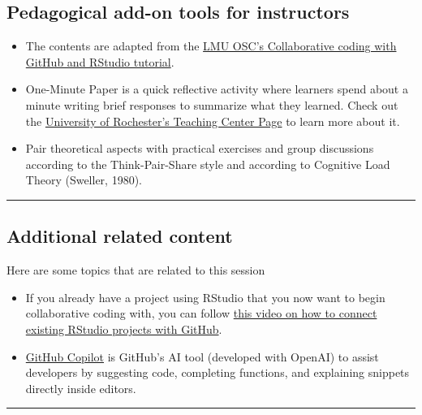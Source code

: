 \documentclass[
  letterpaper,
  DIV=11,
  numbers=noendperiod]{scrartcl}
\providecommand{\tightlist}{%
  \setlength{\itemsep}{0pt}\setlength{\parskip}{0pt}}
\begin{document}
\subsection{Pedagogical add-on tools for
instructors}\label{pedagogical-add-on-tools-for-instructors}

\begin{itemize}
\tightlist
\item
  The contents are adapted from the
  \href{https://lmu-osc.github.io/Collaborative-RStudio-GitHub/}{LMU
  OSC's Collaborative coding with GitHub and RStudio tutorial}.
\item
  One-Minute Paper is a quick reflective activity where learners spend
  about a minute writing brief responses to summarize what they learned.
  Check out the
  \href{https://www.rochester.edu/college/teaching/teaching-guidance/one-minute-paper.html}{University
  of Rochester's Teaching Center Page} to learn more about it.
\item
  Pair theoretical aspects with practical exercises and group
  discussions according to the Think-Pair-Share style and according to
  Cognitive Load Theory (Sweller, 1980).
\end{itemize}

\begin{center}\rule{0.5\linewidth}{0.5pt}\end{center}

\subsection{Additional related
content}\label{additional-related-content}

Here are some topics that are related to this session

\begin{itemize}
\tightlist
\item
  If you already have a project using RStudio that you now want to begin
  collaborative coding with, you can follow
  \href{https://www.youtube.com/watch?v=bUoN85QvC10}{this video on how
  to connect existing RStudio projects with GitHub}.
\item
  \href{https://github.com/features/copilot}{GitHub Copilot} is GitHub's
  AI tool (developed with OpenAI) to assist developers by suggesting
  code, completing functions, and explaining snippets directly inside
  editors.
\end{itemize}

\begin{center}\rule{0.5\linewidth}{0.5pt}\end{center}
\end{document}
